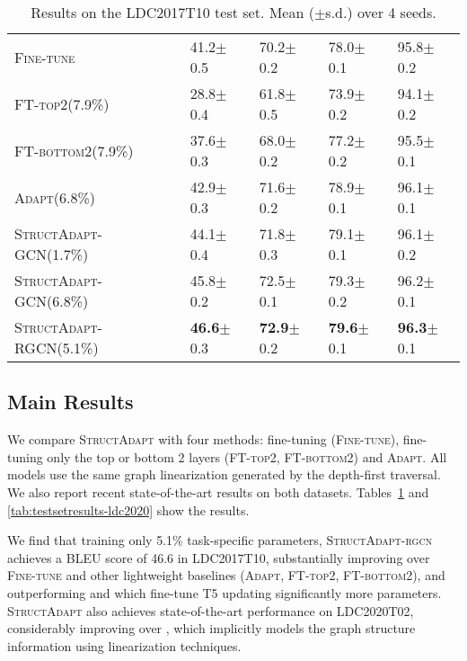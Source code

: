 \documentclass[11pt]{article}
\newcommand{\graphadapter}{{\small\textsc{StructAdapt}}\xspace}
\newcommand{\graphadapterrgcn}{{\small\textsc{StructAdapt-rgcn}}\xspace}
\newcommand{\vanilladapter}{{\small\textsc{Adapt}}\xspace}
\newcommand{\finetune}{{\small\textsc{Fine-tune}}\xspace}
\newcommand{\finetunetop}{{\small\textsc{FT-top2}}\xspace}
\newcommand{\finetunebottom}{{\small\textsc{FT-bottom2}}\xspace}
\begin{document}
\begin{table}[t]
{{\begin{tabular}{@{\hspace*{1mm}}l@{\hspace*{3mm}}l@{\hspace*{3mm}}l@{\hspace*{3mm}}l@{\hspace*{3mm}}l@{\hspace*{1mm}}}
\midrule
\finetune & 41.2{\small $\pm$0.5} & 70.2{\small $\pm$0.2}& 78.0{\small $\pm$0.1} &95.8{\small $\pm$0.2}\\
\finetunetop{\small(7.9\%)} & 28.8{\small $\pm$0.4} & 61.8{\small $\pm$0.5} & 73.9{\small $\pm$0.2} & 94.1{\small $\pm$0.2}\\
\finetunebottom{\small(7.9\%)} & 37.6{\small $\pm$0.3} & 68.0{\small $\pm$0.2} & 77.2{\small $\pm$0.2} & 95.5{\small $\pm$0.1}\\
\vanilladapter{\small(6.8\%)} & 42.9{\small $\pm$0.3} & 71.6{\small $\pm$0.2} & 78.9{\small $\pm$0.1} & 96.1{\small $\pm$0.1}\\
\graphadapter{\small-GCN(1.7\%)} & 44.1{\small $\pm$0.4} & 71.8{\small $\pm$0.3} & 79.1{\small $\pm$0.1} & 96.1{\small $\pm$0.2}\\
\graphadapter{\small-GCN(6.8\%)} & 45.8{\small $\pm$0.2} & 72.5{\small $\pm$0.1} & 79.3{\small $\pm$0.2} & 96.2{\small $\pm$0.1}\\
\graphadapter{\small-RGCN(5.1\%)} & \textbf{46.6}{\small $\pm$0.3} & \textbf{72.9}{\small $\pm$0.2} &\textbf{79.6}{\small $\pm$0.1} & \textbf{96.3}{\small $\pm$0.1}\\
\bottomrule
\end{tabular}}}
\caption{Results on the LDC2017T10 test set. Mean ($\pm$s.d.) over 4 seeds.}
\label{tab:testsetresults}
\end{table}


\subsection{Main Results}

We compare \graphadapter with four methods: fine-tuning (\finetune), fine-tuning only the top or bottom 2 layers (\finetunetop, \finetunebottom) and \vanilladapter. All models use the same graph linearization generated by the depth-first traversal. We also report recent state-of-the-art results on both datasets. Tables~\ref{tab:testsetresults} and \ref{tab:testsetresults-ldc2020} show the results.
 

We find that training only 5.1\% task-specific parameters, \graphadapterrgcn achieves a BLEU score of 46.6 in LDC2017T10, substantially improving over \finetune and other lightweight baselines (\vanilladapter, \finetunetop, \finetunebottom), and outperforming \citet{ribeiro2020investigating} and \citet{hoyle2020promoting} which fine-tune T5 updating significantly more parameters. \graphadapter also achieves state-of-the-art performance on LDC2020T02, considerably improving over \citet{Micheleamr}, which implicitly models the graph structure information using linearization techniques.
\end{document}
